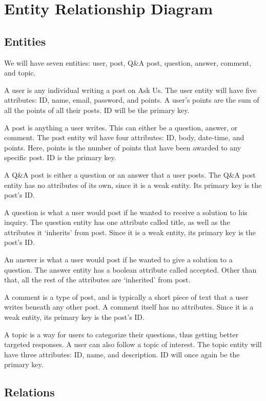 \section{Entity Relationship Diagram}
\subsection{Entities}
We will have seven entities: user, post, Q\&A post, question, answer, comment, and topic.

A user is any individual writing a post on Ask Us. The user entity will have five attributes: ID, name, email, password, and points. A user's points are the sum of all the points of all their posts. ID will be the primary key.

A post is anything a user writes. This can either be a question, answer, or comment. The post entity wil have four attributes: ID, body, date-time, and points. Here, points is the number of points that have been awarded to any specific post. ID is the primary key.

A Q\&A post is either a question or an answer that a user posts. The Q\&A post entity has no attributes of its own, since it is a weak entity. Its primary key is the post's ID.

A question is what a user would post if he wanted to receive a solution to his inquiry. The question entity has one attribute called title, as well as the attributes it `inherits' from post. Since it is a weak entity, its primary key is the post's ID.

An answer is what a user would post if he wanted to give a solution to a question. The answer entity has a boolean attribute called accepted. Other than that, all the rest of the attributes are `inherited' from post.

A comment is a type of post, and is typically a short piece of text that a user writes beneath any other post. A comment itself has no attributes. Since it is a weak entity, its primary key is the post's ID.

A topic is a way for users to categorize their questions, thus getting better targeted responses. A user can also follow a topic of interest. The topic entity will have three attributes: ID, name, and description. ID will once again be the primary key.

\subsection{Relations}

